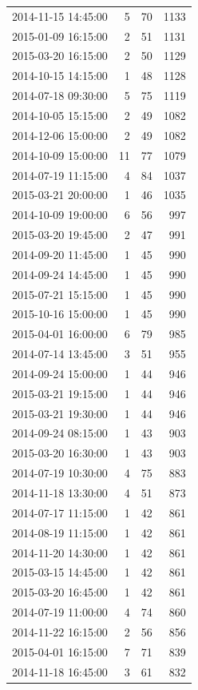 \begin{tabular}{lrrr}
2014-11-15 14:45:00 & 5 & 70 & 1133 \\
2015-01-09 16:15:00 & 2 & 51 & 1131 \\
2015-03-20 16:15:00 & 2 & 50 & 1129 \\
2014-10-15 14:15:00 & 1 & 48 & 1128 \\
2014-07-18 09:30:00 & 5 & 75 & 1119 \\
2014-10-05 15:15:00 & 2 & 49 & 1082 \\
2014-12-06 15:00:00 & 2 & 49 & 1082 \\
2014-10-09 15:00:00 & 11 & 77 & 1079 \\
2014-07-19 11:15:00 & 4 & 84 & 1037 \\
2015-03-21 20:00:00 & 1 & 46 & 1035 \\
2014-10-09 19:00:00 & 6 & 56 & 997 \\
2015-03-20 19:45:00 & 2 & 47 & 991 \\
2014-09-20 11:45:00 & 1 & 45 & 990 \\
2014-09-24 14:45:00 & 1 & 45 & 990 \\
2015-07-21 15:15:00 & 1 & 45 & 990 \\
2015-10-16 15:00:00 & 1 & 45 & 990 \\
2015-04-01 16:00:00 & 6 & 79 & 985 \\
2014-07-14 13:45:00 & 3 & 51 & 955 \\
2014-09-24 15:00:00 & 1 & 44 & 946 \\
2015-03-21 19:15:00 & 1 & 44 & 946 \\
2015-03-21 19:30:00 & 1 & 44 & 946 \\
2014-09-24 08:15:00 & 1 & 43 & 903 \\
2015-03-20 16:30:00 & 1 & 43 & 903 \\
2014-07-19 10:30:00 & 4 & 75 & 883 \\
2014-11-18 13:30:00 & 4 & 51 & 873 \\
2014-07-17 11:15:00 & 1 & 42 & 861 \\
2014-08-19 11:15:00 & 1 & 42 & 861 \\
2014-11-20 14:30:00 & 1 & 42 & 861 \\
2015-03-15 14:45:00 & 1 & 42 & 861 \\
2015-03-20 16:45:00 & 1 & 42 & 861 \\
2014-07-19 11:00:00 & 4 & 74 & 860 \\
2014-11-22 16:15:00 & 2 & 56 & 856 \\
2015-04-01 16:15:00 & 7 & 71 & 839 \\
2014-11-18 16:45:00 & 3 & 61 & 832 \\

\end{tabular}
